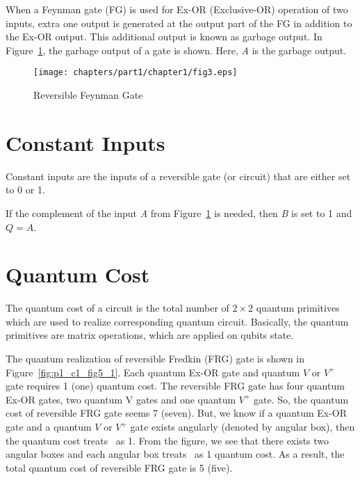 
\begin{example}\textnormal{
When a Feynman gate (FG) is used for Ex-OR (Exclusive-OR) operation of two inputs, extra one output is generated at the output part of the FG in addition to the Ex-OR output. This additional output is known as garbage output. In Figure~\ref{fig:p1_c1_fig3}, the garbage output of a gate is shown. Here, \textit{A} is the garbage output.}
\end{example}

\begin{figure}[H]
\centering
\texttt{[image: chapters/part1/chapter1/fig3.eps]}
\caption{Reversible Feynman Gate}
\label{fig:p1_c1_fig3}
\end{figure}

\section{Constant Inputs}
Constant inputs are the inputs of a reversible gate (or circuit) that are either set to 0 or 1.

\begin{example}\textnormal{
If the complement of the input \textit{A} from Figure~\ref{fig:p1_c1_fig3} is needed, then \textit{B} is set to 1 and $Q = A$.}
\end{example}

\section{Quantum Cost}
The quantum cost of a circuit is the total number of $2 \times 2$ quantum primitives which are used to realize corresponding quantum circuit. Basically, the quantum primitives are matrix operations, which are applied on qubits state.%




\begin{example}\textnormal{
The quantum realization of reversible Fredkin (FRG) gate is shown in Figure~\ref{fig:p1_c1_fig5_1}. Each quantum Ex-OR gate and quantum $V$ or $V^+$ gate requires 1 (one) quantum cost. The reversible FRG gate has four quantum Ex-OR gates, two quantum V gates and one quantum $V^+$ gate. So, the quantum cost of reversible FRG gate seems 7 (seven). But, we know if a quantum Ex-OR gate and a quantum $V$ or $V^+$ gate exists angularly (denoted by angular box), then the quantum cost treats~ as 1. From the figure, we see that there exists two angular boxes and each angular box treats~ as 1 quantum cost. As a result, the total quantum cost of reversible FRG gate is 5 (five).}
\end{example}

